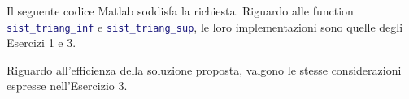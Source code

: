\begin{center}
\footnotesize\noindent{}\end{center}

\noindent Il seguente codice Matlab soddisfa la richiesta. Riguardo alle function \lstinline[language=Matlab]{sist_triang_inf} e \lstinline[language=Matlab]{sist_triang_sup}, le loro implementazioni sono quelle degli Esercizi 1 e 3.



\noindent Riguardo all'efficienza della soluzione proposta, valgono le stesse considerazioni espresse nell'Esercizio 3.
